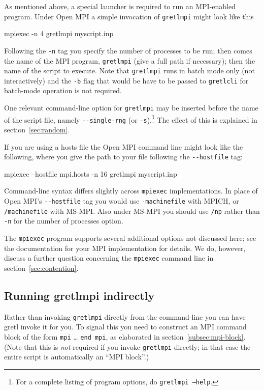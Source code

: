 \documentclass{article}
\def\mymbox{\leavevmode\hbox}
\begin{document}
As mentioned above, a special launcher is required to run an
MPI-enabled program. Under \textsf{Open MPI} a simple invocation of
\texttt{gretlmpi} might look like this
\begin{code}
mpiexec -n 4 gretlmpi myscript.inp
\end{code}
Following the \verb|-n| tag you specify the number of processes to be
run; then comes the name of the MPI program, \texttt{gretlmpi}
(give a full path if necessary); then the name of the script to
execute. Note that \texttt{gretlmpi} runs in batch mode only (not
interactively) and the \verb|-b| flag that would be have to be passed
to \texttt{gretlcli} for batch-mode operation is not required.

One relevant command-line option for \texttt{gretlmpi} may be
inserted before the name of the script file, namely
\verb|--single-rng| (or \verb|-s|).\footnote{For a complete listing of
  program options, do \texttt{gretlmpi --help}.}  The effect of
this is explained in section~\ref{sec:random}.

If you are using a hosts file the \textsf{Open MPI} command line might
look like the following, where you give the path to your file
following the \verb|--hostfile| tag:
\begin{code}
mpiexec --hostfile mpi.hosts -n 16 gretlmpi myscript.inp
\end{code}

Command-line syntax differs slightly across \texttt{mpiexec}
implementations. In place of \textsf{Open MPI}'s
\mymbox{\verb|--hostfile|} tag you would use \verb|-machinefile| with
\textsf{MPICH}, or \verb|/machinefile| with \textsf{MS-MPI}. Also
under \textsf{MS-MPI} you should use \texttt{/np} rather than
\texttt{-n} for the number of processes option.

The \texttt{mpiexec} program supports several additional options not
discussed here; see the documentation for your MPI implementation for
details. We do, however, discuss a further question concerning the
\texttt{mpiexec} command line in section~\ref{sec:contention}.

\subsection{Running gretlmpi indirectly}
\label{subsec:mpi-indirect}

Rather than invoking \texttt{gretlmpi} directly from the command
line you can have gretl invoke it for you. To signal this you need to
construct an MPI command block of the form \texttt{mpi} \dots{}
\texttt{end mpi}, as elaborated in
section~\ref{subsec:mpi-block}. (Note that this is \emph{not} required
if you invoke \texttt{gretlmpi} directly; in that case the entire
script is automatically an ``MPI block''.)
\end{document}
